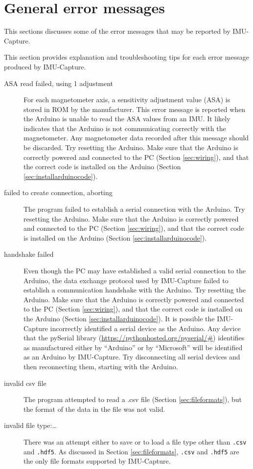 \documentclass[11pt,letterpaper,article,oneside]{memoir}
\newcommand{\name}{IMU-Capture}
\newcommand{\csv}{\texttt{.csv}}
\newcommand{\hdf}{\texttt{.hdf5}}
\begin{document}
\section{General error messages}

This sections discusses some of the error messages that may be reported by
\name{}.


\newcommand{\genericFix}{Try resetting the Arduino.  Make sure that the Arduino
is correctly powered and connected to the PC (Section \ref{sec:wiring}), and
that the correct code is installed on the Arduino (Section
\ref{sec:installarduinocode}).}

This section provides explanation and troubleshooting tips for each error
message produced by \name{}.

\begin{description}

\item[ASA read failed, using 1 adjustment]
For each magnetometer axis, a sensitivity adjustment value (ASA) is stored in
ROM by the manufacturer.  This error message is reported when the Arduino is
unable to read the ASA values from an IMU.  It likely indicates that the Arduino
is not communicating correctly with the magnetometer.  Any magnetometer data
recorded after this message should be discarded.
\genericFix{}

\item[failed to create connection, aborting]
The program failed to establish a serial connection with the Arduino.
\genericFix{}

\item[handshake failed]
Even though the PC may have established a valid serial connection to the
Arduino, the data exchange protocol used by \name{} failed to establish a
communication handshake with the Arduino.
\genericFix{}
It is possible the \name{} incorrectly identified a serial device as the
Arduino. Any device that the pySerial library
(\url{https://pythonhosted.org/pyserial/#}) identifies as manufactured either by
``Arduino'' or by ``Microsoft'' will be identified as an Arduino by \name{}. Try
disconnecting all serial devices and then reconnecting them, starting with the
Arduino.

\item[invalid csv file]
The program attempted to read a .csv file (Section \ref{sec:fileformats}), but
the format of the data in the file was not valid.

\item[invalid file type:\ldots]
There was an attempt either to save or to load a file type other than
\csv{} and \hdf{}. As discussed in Section \ref{sec:fileformats},
\csv{} and \hdf{} are the only file formats supported by \name.


\end{description}
\end{document}
